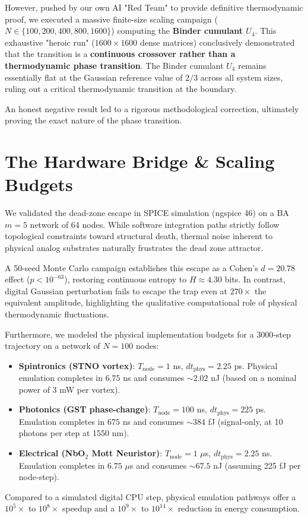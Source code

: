 \documentclass[11pt, a4paper]{article}
\begin{document}
However, pushed by our own AI "Red Team" to provide definitive thermodynamic proof, we executed a massive finite-size scaling campaign ($N \in \{100, 200, 400, 800, 1600\}$) computing the \textbf{Binder cumulant $U_4$}. This exhaustive "heroic run" ($1600 \times 1600$ dense matrices) conclusively demonstrated that the transition is a \textbf{continuous crossover rather than a thermodynamic phase transition}. The Binder cumulant $U_4$ remains essentially flat at the Gaussian reference value of $2/3$ across all system sizes, ruling out a critical thermodynamic transition at the boundary. 

An honest negative result led to a rigorous methodological correction, ultimately proving the exact nature of the phase transition.

\section{The Hardware Bridge \& Scaling Budgets}

We validated the dead-zone escape in SPICE simulation (ngspice 46) on a BA $m=5$ network of 64 nodes. While software integration paths strictly follow topological constraints toward structural death, thermal noise inherent to physical analog substrates naturally frustrates the dead zone attractor. 

A 50-seed Monte Carlo campaign establishes this escape as a Cohen's $d = 20.78$ effect ($p < 10^{-63}$), restoring continuous entropy to $H \approx 4.30$ bits. In contrast, digital Gaussian perturbation fails to escape the trap even at $270\times$ the equivalent amplitude, highlighting the qualitative computational role of physical thermodynamic fluctuations.

Furthermore, we modeled the physical implementation budgets for a 3000-step trajectory on a network of $N=100$ nodes:
\begin{itemize}
    \item \textbf{Spintronics (STNO vortex)}: $T_{\mathrm{node}} = 1$ ns, $dt_{\mathrm{phys}} = 2.25$ ps. Physical emulation completes in $6.75$ ns and consumes $\sim 2.02$ nJ (based on a nominal power of 3 mW per vortex).
    \item \textbf{Photonics (GST phase-change)}: $T_{\mathrm{node}} = 100$ ns, $dt_{\mathrm{phys}} = 225$ ps. Emulation completes in $675$ ns and consumes $\sim 384$ fJ (signal-only, at 10 photons per step at 1550 nm).
    \item \textbf{Electrical (NbO$_2$ Mott Neuristor)}: $T_{\mathrm{node}} = 1$ $\mu$s, $dt_{\mathrm{phys}} = 2.25$ ns. Emulation completes in $6.75$ $\mu$s and consumes $\sim 67.5$ nJ (assuming 225 fJ per node-step).
\end{itemize}
Compared to a simulated digital CPU step, physical emulation pathways offer a $10^5\times$ to $10^8\times$ speedup and a $10^9\times$ to $10^{14}\times$ reduction in energy consumption.
\end{document}
